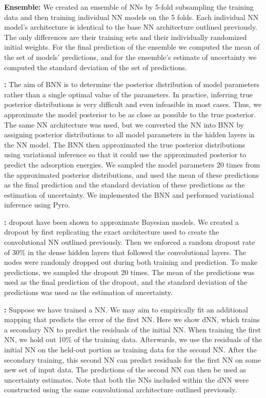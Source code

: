 \documentclass[]{achemso}
\begin{document}
\textbf{ Ensemble:}
We created an ensemble of \gls{NN}s by 5-fold subsampling the training data and then training individual \gls{NN} models on the 5 folds.
Each individual \gls{NN} model's architecture is identical to the base \gls{NN} architecture outlined previously.
The only differences are their training sets and their individually randomized initial weights.
For the final prediction of the ensemble we computed the mean of the set of models' predictions, and for the ensemble's estimate of uncertainty we computed the standard deviation of the set of predictions.

\textbf{:}
The aim of \gls{BNN} is to determine the posterior distribution of model parameters rather than a single optimal value of the parameters.
In practice, inferring true posterior distributions is very difficult and even infeasible in most cases.
Thus, we approximate the model posterior to be as close as possible to the true posterior.
The same \gls{NN} architecture was used, but we converted the \gls{NN} into \gls{BNN} by assigning posterior distributions to all model parameters in the hidden layers in the \gls{NN} model. 
The \gls{BNN} then approximated the true posterior distributions using variational inference so that it could use the approximated posterior to predict the adsorption energies.
We sampled the model parameters 20 times from the approximated posterior distributions, and used the mean of these predictions as the final prediction and the standard deviation of these predictions as the estimation of uncertainty.
We implemented the \gls{BNN} and performed variational inference using Pyro.\cite{Bingham2018}

\textbf{:}
\gls{dropout} have been shown to approximate Bayesian models.\cite{Gal2016}
We created a \gls{dropout} by first replicating the exact architecture used to create the convolutional \gls{NN} outlined previously. 
Then we enforced a random dropout rate of 30\% in the dense hidden layers that followed the convolutional layers.
The nodes were randomly dropped out during both training and prediction.
To make predictions, we sampled the \gls{dropout} 20 times.
The mean of the predictions was used as the final prediction of the \gls{dropout}, and the standard deviation of the predictions was used as the estimation of uncertainty.

\textbf{:}
Suppose we have trained a \gls{NN}.
We may aim to empirically fit an additional mapping that predicts the error of the first \gls{NN}.
Here we show \gls{dNN}, which trains a secondary \gls{NN} to predict the residuals of the initial \gls{NN}.
When training the first \gls{NN}, we hold out 10\% of the training data.
Afterwards, we use the residuals of the initial \gls{NN} on the held-out portion as training data for the second \gls{NN}.
After the secondary training, this second \gls{NN} can predict residuals for the first \gls{NN} on some new set of input data.
The predictions of the second \gls{NN} can then be used as uncertainty estimates.
Note that both the \gls{NN}s included within the \gls{dNN} were constructed using the same convolutional architecture outlined previously.
\end{document}
